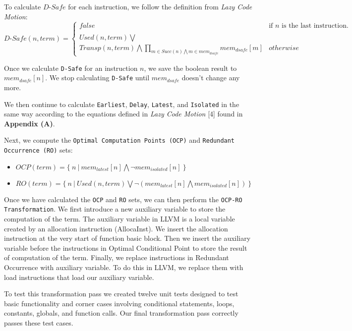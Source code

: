 \documentclass[onecolumn,10pt]{journal}
\begin{document}
To calculate $D\text{-}Safe$ for each instruction, we follow the definition from \textit{Lazy Code Motion}:
\newline
\newline
$
D\text{-}Safe(n, term) = 
\begin{cases}
false & \text{if } n\text{ is the last instruction.} \\
\\
Used(n, term) \bigvee \\
Transp(n, term) \bigwedge \prod\limits_{m \in Succ(n) \bigwedge m \in mem_{dsafe}}mem_{dsafe}[m] & otherwise
\end{cases}
$
\newline

Once we calculate \texttt{D-Safe} for an instruction $n$, we save the boolean result to $mem_{dsafe}[n]$. We stop calculating \texttt{D-Safe} until $mem_{dsafe}$ doesn't change any more.    

We then continue to calculate \texttt{Earliest}, \texttt{Delay}, \texttt{Latest}, and \texttt{Isolated} in the same way according to the equations defined in \textit{Lazy Code Motion} [4] found in \textbf{Appendix (A)}.  

Next, we compute the \texttt{Optimal Computation Points (OCP)} and \texttt{Redundant Occurrence (RO)} sets: 
\begin{itemize}
\item $OCP(term) = \{\ n\ |\ mem_{latest}[n] \bigwedge \neg mem_{isolated}[n] \ \}$
\item $RO(term) = \{\ n\ |\ Used(n, term) \bigvee \neg ( mem_{latest}[n] \bigwedge mem_{isolated}[n] ) \ \}$
\end{itemize}

Once we have calculated the \texttt{OCP} and \texttt{RO} sets, we can then perform the \texttt{OCP-RO Transformation}. We first introduce a new auxiliary variable to store the computation of the term. The auxiliary variable in LLVM is a local variable created by an allocation instruction (AllocaInst). We insert the allocation instruction at the very start of function basic block. Then we insert the auxiliary variable before the instructions in Optimal Conditional Point to store the result of computation of the term. Finally, we replace instructions in Redundant Occurrence with auxiliary variable. To do this in LLVM, we replace them with load instructions that load our auxiliary variable.

To test this transformation pass we created twelve unit tests designed to test basic functionality and corner cases involving conditional statements, loops, constants, globals, and function calls. Our final transformation pass correctly passes these test cases.
\end{document}

